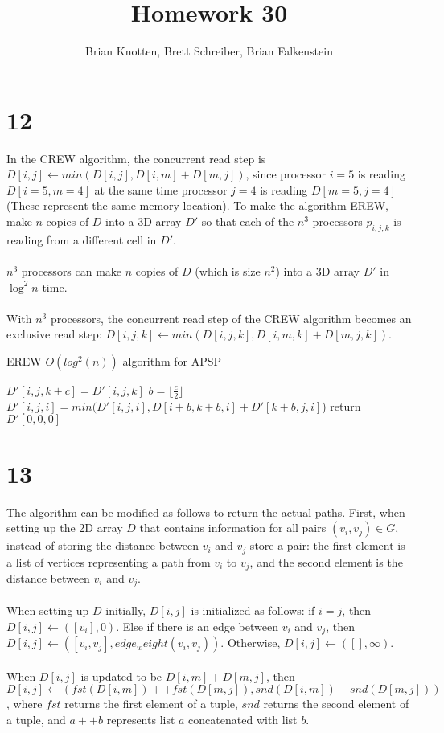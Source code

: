 \documentclass[letterpaper,notitlepage,twoside]{article}
\begin{document}
\title{Homework 30}
\author{Brian Knotten, Brett Schreiber, Brian Falkenstein}
\maketitle

\section*{12}
In the CREW algorithm, the concurrent read step is $D[i,j] \gets min(D[i, j], D[i, m] + D[m, j])$, since processor $i = 5$ is reading $D[i = 5, m = 4]$ at the same time processor $j = 4$ is reading $D[m = 5, j = 4]$ (These represent the same memory location). To make the algorithm EREW, make $n$ copies of $D$ into a 3D array $D'$ so that each of the $n^3$ processors $p_{i, j, k}$ is reading from a different cell in $D'$.
\\\\
$n^3$ processors can make $n$ copies of $D$ (which is size $n^2$) into a 3D array $D'$ in $\log^2 n$ time.
\\\\
With $n^3$ processors, the concurrent read step of the CREW algorithm becomes an exclusive read step: $D[i, j, k] \gets min(D[i, j, k], D[i, m, k] + D[m, j, k])$. 
\begin{algorithm}
  \begin{algorithmic}%
    \caption{EREW $O(log^{2} (n))$ algorithm for APSP}
    \Require 
    		\State $D'[i, j, k+c] = D'[i, j, k]$
    	\EndIf
    	\State $b = \lfloor{\frac{c}{2}}\rfloor$
        		\State $D'[i, j, i] = min(D'[i, j, i], D[i+b, k+b, i] + D'[k+b, j, i]$)
	\EndWhile
		return $D'[0, 0, 0]$
	\EndIf
    \EndWhile
  \end{algorithmic}
\end{algorithm}

\section*{13}
The algorithm can be modified as follows to return the actual paths. First, when setting up the 2D array $D$ that contains information for all pairs $(v_i, v_j) \in G$, instead of storing the distance between $v_i$ and $v_j$ store a pair: the first element is a list of vertices representing a path from $v_i$ to $v_j$, and the second element is the distance between $v_i$ and $v_j$.
\\\\
When setting up $D$ initially, $D[i, j]$ is initialized as follows: if $i = j$, then $D[i, j] \gets ([v_i], 0)$. Else if there is an edge between $v_i$ and $v_j$, then $D[i, j] \gets ([v_i, v_j], edge_weight(v_i, v_j))$. Otherwise, $D[i, j] \gets ([], \infty)$.
\\\\
When $D[i, j]$ is updated to be $D[i, m] + D[m, j]$, then $D[i, j] \gets (fst(D[i, m]) ++ fst(D[m, j]), snd(D[i, m]) + snd(D[m, j]))$, where $fst$ returns the first element of a tuple, $snd$ returns the second element of a tuple, and $a ++ b$ represents list $a$ concatenated with list $b$.
\end{document}
